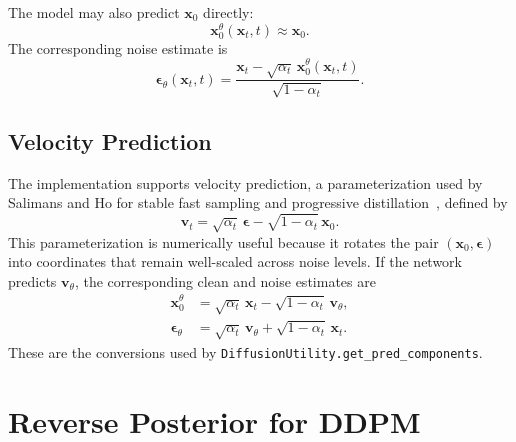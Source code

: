 \documentclass[11pt]{article}
\newcommand{\bx}{\mathbf{x}}
\newcommand{\bv}{\mathbf{v}}
\newcommand{\beps}{\boldsymbol{\epsilon}}
\begin{document}
The model may also predict $\bx_0$ directly:
\begin{equation}
  \bx_0^\theta(\bx_t,t) \approx \bx_0.
\end{equation}
The corresponding noise estimate is
\begin{equation}
  \beps_\theta(\bx_t,t)
  =
  \frac{\bx_t-\sqrt{\alpha_t}\,\bx_0^\theta(\bx_t,t)}{\sqrt{1-\alpha_t}}.
  \label{eq:eps_from_x0}
\end{equation}

\subsection{Velocity Prediction}

The implementation supports velocity prediction, a parameterization used by Salimans and Ho
for stable fast sampling and progressive distillation~\cite{salimans2022progressive}, defined by
\begin{equation}
  \bv_t = \sqrt{\alpha_t}\,\beps - \sqrt{1-\alpha_t}\,\bx_0.
  \label{eq:velocity_target}
\end{equation}
This parameterization is numerically useful because it rotates the pair $(\bx_0,\beps)$ into coordinates
that remain well-scaled across noise levels.  If the network predicts $\bv_\theta$, the corresponding
clean and noise estimates are
\begin{align}
  \bx_0^\theta &= \sqrt{\alpha_t}\,\bx_t - \sqrt{1-\alpha_t}\,\bv_\theta, \\
  \beps_\theta &= \sqrt{\alpha_t}\,\bv_\theta + \sqrt{1-\alpha_t}\,\bx_t.
  \label{eq:v_to_components}
\end{align}
These are the conversions used by \texttt{DiffusionUtility.get\_pred\_components}.

\section{Reverse Posterior for DDPM}
\end{document}
